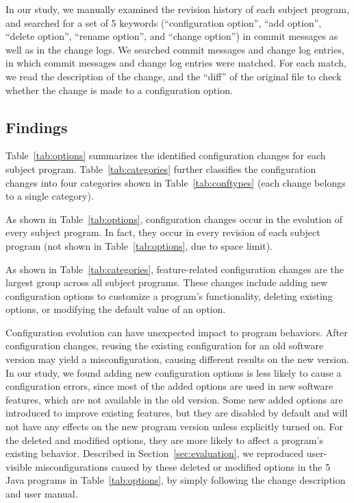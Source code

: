In our study, %
we manually examined the revision history of each subject program,
and searched for a set of 5 keywords (``configuration option'', ``add option'',
``delete option'', ``rename option'', and ``change option'')
in commit messages as well as in the change logs.
We searched  commit messages and  change log entries, in
which  commit messages and  change log entries were matched.
For each match, we read the description of the change,
and the ``diff'' of the original file to check whether
the change is made to a configuration option.




\subsection{Findings}

Table~\ref{tab:options} summarizes the identified
configuration changes for each subject program.
Table~\ref{tab:categories} further classifies the
configuration changes into four categories shown
in Table~\ref{tab:conftypes} (each change belongs to a single category).


As shown in Table~\ref{tab:options}, configuration changes occur
in the evolution of every subject program. In fact, they occur in
every revision of each subject program (not shown in Table~\ref{tab:options},
due to space limit).  

As shown in Table~\ref{tab:categories},
feature-related configuration changes are the largest group across
all subject programs. These changes include
adding new configuration options to customize a program's
functionality, deleting existing options, or modifying the default
value of an option. 

Configuration evolution can have unexpected impact to
program behaviors. After configuration changes, reusing
the existing configuration for an old software version
may yield a misconfiguration, causing different results
on the new version. In our study, we found adding
new configuration options is less likely to cause
a configuration errors, since most of the added options are
used in new software features, which are not available in
the old version. Some new added options are introduced
to improve existing features, but they are disabled by
default and will not have any effects on the new program
version unless explicitly turned on. For the deleted
and modified options, they are more likely to affect a
program's existing behavior. Described in
Section~\ref{sec:evaluation}, we reproduced \errornum
user-visible misconfigurations caused by these
deleted or modified options in the 5 Java programs in Table~\ref{tab:options},
by simply following the change description and user manual.


